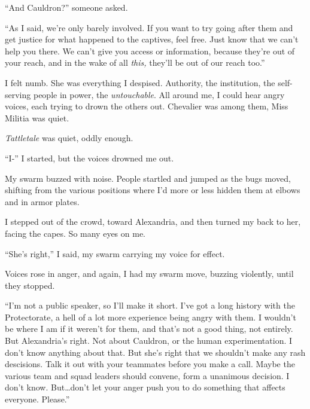 ``And Cauldron?'' someone asked.



``As I said, we're only barely involved.  If you want to try going after them and get justice for what happened to the captives, feel free.  Just know that we can't help you there.  We can't give you access or information, because they're out of your reach, and in the wake of all \emph{this, }they'll be out of our reach too.''



I felt numb.  She was everything I despised.  Authority, the institution, the self-serving people in power, the \emph{untouchable}.  All around me, I could hear angry voices, each trying to drown the others out.  Chevalier was among them, Miss Militia was quiet.



\emph{Tattletale} was quiet, oddly enough.



``I-'' I started, but the voices drowned me out.



My swarm buzzed with noise.  People startled and jumped as the bugs moved, shifting from the various positions where I'd more or less hidden them at elbows and in armor plates.



I stepped out of the crowd, toward Alexandria, and then turned my back to her, facing the capes.  So many eyes on me.



``She's right,'' I said, my swarm carrying my voice for effect.



Voices rose in anger, and again, I had my swarm move, buzzing violently, until they stopped.



``I'm not a public speaker, so I'll make it short.  I've got a long history with the Protectorate, a hell of a lot more experience being angry with them.  I wouldn't be where I am if it weren't for them, and that's not a good thing, not entirely.  But Alexandria's right.  Not about Cauldron, or the human experimentation.  I don't know anything about that.  But she's right that we shouldn't make any rash descisions.  Talk it out with your teammates before you make a call.  Maybe the various team and squad leaders should convene, form a unanimous decision.  I don't know.  But\ldots don't let your anger push you to do something that affects everyone.  Please.''



